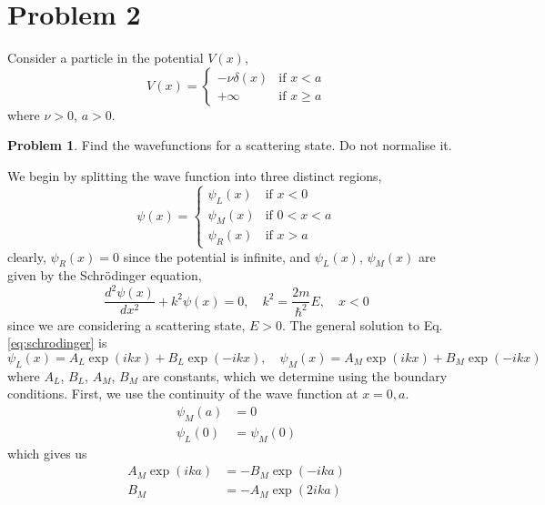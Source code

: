 \documentclass{article}
\theoremstyle{definition}
\newtheorem{definition}{Problem}[section]
\theoremstyle{remark}
\begin{document}
\section{Problem 2}
Consider a particle in the potential $V(x)$,
\begin{equation}
    \label{eq:potential}
    V(x) = \begin{cases}
        -\nu\delta(x) & \text{if } x < a\\
        +\infty & \text{if } x \geq a
    \end{cases}
\end{equation}
where $\nu>0$, $a>0$.\\
\begin{definition}
    Find the wavefunctions for a scattering state. Do not normalise it.
\end{definition}
We begin by splitting the wave function into three distinct regions,
\begin{equation}
    \label{eq:wave function}
    \psi(x) = \begin{cases}
        \psi_L(x) & \text{if } x < 0\\
        \psi_M(x) & \text{if } 0 < x < a\\
        \psi_R(x) & \text{if } x > a
    \end{cases}
\end{equation}
clearly, $\psi_R(x) = 0$ since the potential is infinite, and $\psi_L(x)$, $\psi_M(x)$ are given by the Schr\"odinger equation,
\begin{equation}
    \label{eq:schrodinger}
    \frac{d^2\psi(x)}{dx^2} + k^2\psi(x) = 0, \quad k^2 = \frac{2m}{\hbar^2}E, \quad x<0
\end{equation}
since we are considering a scattering state, $E>0$. The general solution to Eq. \ref{eq:schrodinger} is
\begin{equation}
    \label{eq:general solution}
    \psi_L(x) = A_L\exp(ikx) + B_L\exp(-ikx), \quad \psi_M(x) = A_M\exp(ikx) + B_M\exp(-ikx)
\end{equation}
where $A_L$, $B_L$, $A_M$, $B_M$ are constants, which we determine using the boundary conditions. First, we use the continuity of the wave function at $x=0, a$.
\begin{align*}
    \psi_M(a) &= 0\\
    \psi_L(0) &= \psi_M(0)
\end{align*}
which gives us
\begin{align*}
    A_M\exp(ika) &= - B_M\exp(-ika) \\
    B_M &= -A_M\exp(2ika)
\end{align*}
\end{document}
